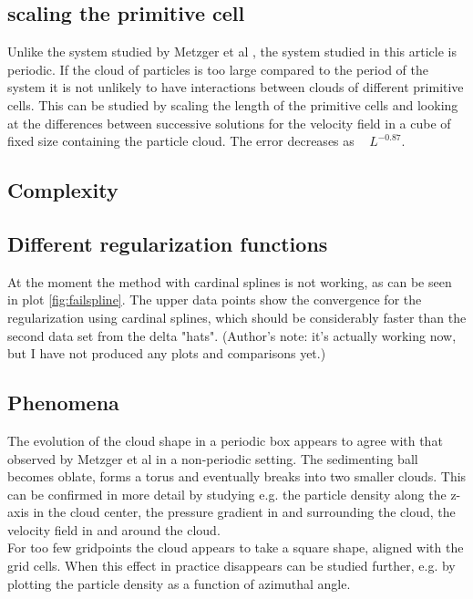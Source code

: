 \documentclass[a4paper,twoside=false,abstract=false,numbers=noenddot,
titlepage=false,headings=small,parskip=half,version=last]{scrartcl}
\begin{document}
\subsection{scaling the primitive cell}\label{cellscale}
Unlike the system studied by Metzger et al \cite{fallingclouds}, the system studied in this article is periodic. If the cloud of particles is too large compared to the period of the system it is not unlikely to have interactions between clouds of different primitive cells. This can be studied by scaling the length of the primitive cells and looking at the differences between successive solutions for the velocity field in a cube of fixed size containing the particle cloud. The error decreases as ~ $L^{-0.87}$.

\subsection{Complexity}
\subsection{Different regularization functions}
At the moment the method with cardinal splines is not working, as can be seen in plot \ref{fig:failspline}. The upper data points show the convergence for the regularization using cardinal splines, which should be considerably faster than the second data set from the delta "hats". (Author's note: it's actually working now, but I have not produced any plots and comparisons yet.)

\subsection{Phenomena}
The evolution of the cloud shape in a periodic box appears to agree with that observed by Metzger et al \cite{fallingclouds} in a non-periodic setting. The sedimenting ball becomes oblate, forms a torus and eventually breaks into two smaller clouds. This can be confirmed in more detail by studying e.g. the particle density along the z-axis in the cloud center, the pressure gradient in and surrounding the cloud, the velocity field in and around the cloud.\\
For too few gridpoints the cloud appears to take a square shape, aligned with the grid cells. When this effect in practice disappears can be studied further, e.g. by plotting the particle density as a function of azimuthal angle.\\
\end{document}
